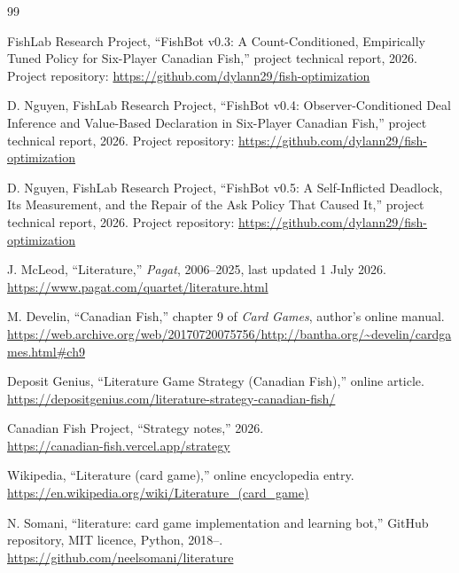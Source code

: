 \begin{thebibliography}{99}


FishLab Research Project, ``FishBot v0.3: A Count-Conditioned, Empirically Tuned
Policy for Six-Player Canadian Fish,'' project technical report, 2026. Project
repository: \url{https://github.com/dylann29/fish-optimization}

D. Nguyen, FishLab Research Project, ``FishBot v0.4: Observer-Conditioned Deal
Inference and Value-Based Declaration in Six-Player Canadian Fish,'' project
technical report, 2026. Project repository:
\url{https://github.com/dylann29/fish-optimization}

D. Nguyen, FishLab Research Project, ``FishBot v0.5: A Self-Inflicted Deadlock,
Its Measurement, and the Repair of the Ask Policy That Caused It,'' project
technical report, 2026. Project repository:
\url{https://github.com/dylann29/fish-optimization}

J. McLeod, ``Literature,'' \emph{Pagat}, 2006--2025, last updated 1 July 2026.\\
\url{https://www.pagat.com/quartet/literature.html}

M. Develin, ``Canadian Fish,'' chapter 9 of \emph{Card Games}, author's online
manual.\\
\url{https://web.archive.org/web/20170720075756/http://bantha.org/~develin/cardgames.html\#ch9}

Deposit Genius, ``Literature Game Strategy (Canadian Fish),'' online article.\\
\url{https://depositgenius.com/literature-strategy-canadian-fish/}

Canadian Fish Project, ``Strategy notes,'' 2026.\\
\url{https://canadian-fish.vercel.app/strategy}

Wikipedia, ``Literature (card game),'' online encyclopedia entry.\\
\url{https://en.wikipedia.org/wiki/Literature_(card_game)}

N. Somani, ``literature: card game implementation and learning bot,'' GitHub
repository, MIT licence, Python, 2018--.\\
\url{https://github.com/neelsomani/literature}


\end{thebibliography}
